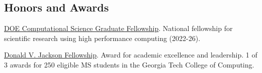 \subsection*{\textbf{Honors and Awards}}
\href{https://www.krellinst.org/csgf/}{DOE Computational Science Graduate Fellowship}. National fellowship for scientific research using high performance computing (2022-26).

\href{https://sites.gatech.edu/gtcomputingawards2021/graduate-student-awards/}{Donald V. Jackson Fellowship}. Award for academic excellence and leadership. 1 of 3 awards for 250 eligible MS students in the Georgia Tech College of Computing.
